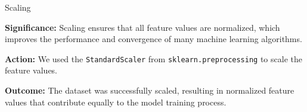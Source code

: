 \documentclass[14pt, aspectratio=169]{beamer}
\begin{document}
\begin{frame}{Scaling}
  \begin{block}{}
    \textbf{Significance:} \small
    Scaling ensures that all feature values are normalized, which improves the performance and convergence of many machine learning algorithms.
  \end{block}
  \begin{block}{}
    \textbf{Action:} \small
    We used the \texttt{StandardScaler} from \texttt{sklearn.preprocessing} to scale the feature values.
  \end{block}
  \begin{block}{}
    \textbf{Outcome:} \small
    The dataset was successfully scaled, resulting in normalized feature values that contribute equally to the model training process.
  \end{block}
\end{frame}
\end{document}
